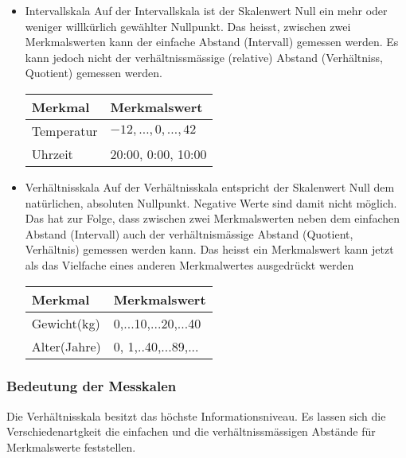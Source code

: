 \begin{itemize}
\item Intervallskala
\subitem Auf der Intervallskala ist der Skalenwert Null ein mehr oder weniger willkürlich gewählter Nullpunkt. Das heisst, zwischen zwei Merkmalswerten kann der einfache Abstand (Intervall) gemessen werden. Es kann jedoch nicht der verhältnissmässige (relative) Abstand (Verhältniss, Quotient) gemessen werden.
\begin{table}[ht]
\centering
\begin{tabular}{@{}ll@{}}
\toprule
Merkmal & Merkmalswert \\ \midrule
Temperatur & $-12, \ldots, 0, \ldots, 42$ \\
Uhrzeit & 20:00, 0:00, 10:00 \\ \bottomrule
\end{tabular}
\end{table}
\item Verhältnisskala
\subitem
Auf der Verhältnisskala entspricht der Skalenwert Null dem natürlichen, absoluten Nullpunkt. Negative Werte sind damit nicht möglich. Das hat zur Folge, dass zwischen zwei Merkmalswerten neben dem einfachen Abstand (Intervall) auch der verhältnismässige Abstand (Quotient, Verhältnis) gemessen werden kann. Das heisst ein Merkmalswert kann jetzt als das Vielfache eines anderen Merkmalwertes ausgedrückt werden
\begin{table}[ht]
\centering
\begin{tabular}{@{}ll@{}}
\toprule
Merkmal & Merkmalswert \\ \midrule
Gewicht(kg) & 0,...10,...20,...40 \\
Alter(Jahre) & 0, 1,..40,...89,... \\ \bottomrule
\end{tabular}
\end{table}
\end{itemize}
\subsubsection{Bedeutung der Messkalen}
\begin{tcolorbox}[colback=green!5,colframe=green!40!black, title=Bedeutung der Messskalen]
Die Verhältnisskala besitzt das höchste Informationsniveau. Es lassen sich die Verschiedenartgkeit die einfachen und die verhältnissmässigen Abstände für Merkmalswerte feststellen.
\end{tcolorbox}
